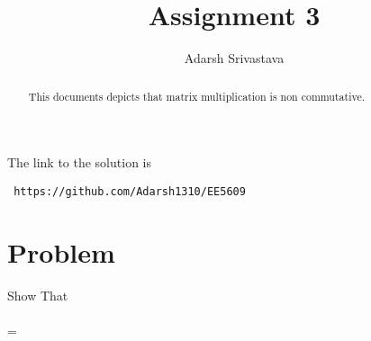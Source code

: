\documentclass[journal,12pt,twocolumn]{IEEEtran}
\begin{document}
     \def\rightbox#1{\makebox[0in][r]{#1}}
     \def\centbox#1{\makebox[0in]{#1}}
     \def\topbox#1{\raisebox{-\baselineskip}[0in][0in]{#1}}
     \def\midbox#1{\raisebox{-0.5\baselineskip}[0in][0in]{#1}}
\vspace{3cm}
\title{Assignment 3}
\author{Adarsh Srivastava}
\maketitle
\newpage
\bigskip
\renewcommand{\thetable}{\theenumi}
The link to the solution is
\begin{lstlisting}
 https://github.com/Adarsh1310/EE5609
\end{lstlisting}
\begin{abstract}
This documents depicts that matrix multiplication is non commutative.
\end{abstract}
\section{\textbf{Problem}}
Show That\\
\\
 \not=
\end{document}
